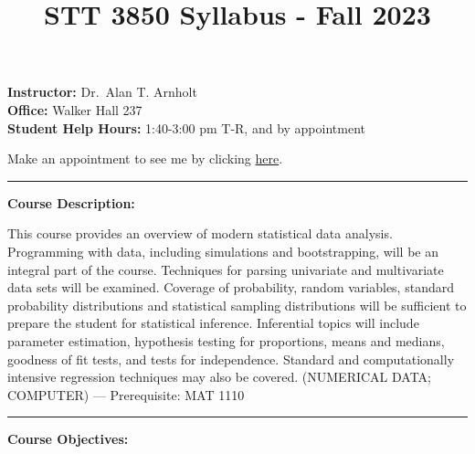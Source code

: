 \documentclass[
]{article}
\title{STT 3850 Syllabus - Fall 2023}
\author{}
\date{\vspace{-2.5em}}
\begin{document}
\maketitle

\textbf{Instructor:} Dr.~Alan T. Arnholt\\
\textbf{Office:} Walker Hall 237\\
\textbf{Student Help Hours:} 1:40-3:00 pm T-R, and by appointment

Make an appointment to see me by clicking
\href{https://calendar.google.com/calendar/u/0/selfsched?sstoken=UUtZb3I1Z1pFczdjfGRlZmF1bHR8MTZjOTU5MGY0ZTFlOTA2MmExNzhlYWQ5MGIzZWQ0OGM}{here}.

\begin{center}\rule{0.5\linewidth}{0.5pt}\end{center}

\textbf{Course Description:}

This course provides an overview of modern statistical data analysis.
Programming with data, including simulations and bootstrapping, will be
an integral part of the course. Techniques for parsing univariate and
multivariate data sets will be examined. Coverage of probability, random
variables, standard probability distributions and statistical sampling
distributions will be sufficient to prepare the student for statistical
inference. Inferential topics will include parameter estimation,
hypothesis testing for proportions, means and medians, goodness of fit
tests, and tests for independence. Standard and computationally
intensive regression techniques may also be covered. (NUMERICAL DATA;
COMPUTER) --- Prerequisite: MAT 1110

\begin{center}\rule{0.5\linewidth}{0.5pt}\end{center}

\textbf{Course Objectives:}
\end{document}
